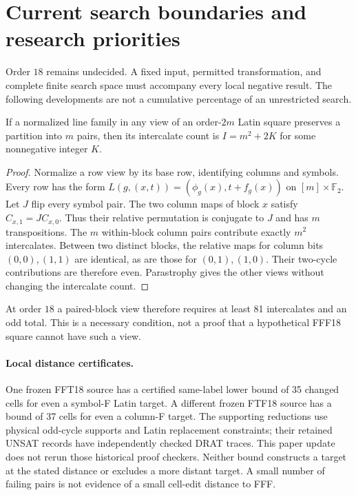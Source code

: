 \section{Current search boundaries and research priorities}
\label{sec:current-boundaries}

Order $18$ remains undecided. A fixed input, permitted transformation,
and complete finite search space must accompany every local negative
result. The following developments are not a cumulative percentage of
an unrestricted search.

\begin{proposition}
\label{prop:pairblock-intercalates}
If a normalized line family in any view of an order-$2m$ Latin square
preserves a partition into $m$ pairs, then its intercalate count is
$I=m^2+2K$ for some nonnegative integer $K$.
\end{proposition}

\begin{proof}
Normalize a row view by its base row, identifying columns and symbols.
Every row has the form
$L(g,(x,t))=(\phi_g(x),t+f_g(x))$ on $[m]\times\mathbb F_2$.
Let $J$ flip every symbol pair. The two column maps of block $x$
satisfy $C_{x,1}=JC_{x,0}$. Thus their relative permutation is
conjugate to $J$ and has $m$ transpositions. The $m$ within-block
column pairs contribute exactly $m^2$ intercalates. Between two distinct
blocks, the relative maps for column bits $(0,0),(1,1)$ are identical,
as are those for $(0,1),(1,0)$. Their two-cycle contributions are
therefore even. Parastrophy gives the other views without changing
the intercalate count.
\end{proof}

At order $18$ a paired-block view therefore requires at least 81
intercalates and an odd total. This is a necessary condition, not
a proof that a hypothetical FFF18 square cannot have such a view.

\paragraph{Local distance certificates.}
One frozen FFT18 source has a certified same-label lower bound of
35 changed cells for even a symbol-F Latin target. A different frozen
FTF18 source has a bound of 37 cells for even a column-F target.
The supporting reductions use physical odd-cycle supports and Latin
replacement constraints; their retained UNSAT records have independently
checked DRAT traces. This paper update does not rerun those historical
proof checkers. Neither bound constructs a target at the stated distance
or excludes a more distant target. A small number of failing pairs
is not evidence of a small cell-edit distance to FFF.

